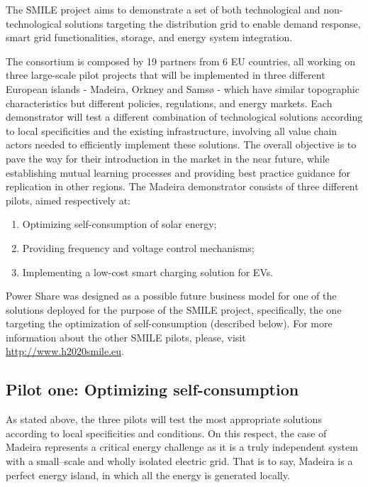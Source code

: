 The SMILE project aims to demonstrate a set of both technological and non-technological solutions targeting the distribution grid to enable demand response, smart grid functionalities, storage, and energy system integration.



The consortium is composed by 19 partners from 6 EU countries, all working on three large-scale pilot projects that will be implemented in three different European islands - Madeira, Orkney and Samsø - which have similar topographic characteristics but different policies, regulations, and energy markets. Each demonstrator will test a different combination of technological solutions according to local specificities and the existing infrastructure, involving all value chain actors needed to efficiently implement these solutions. The overall objective is to pave the way for their introduction in the market in the near future, while establishing mutual learning processes and providing best practice guidance for replication in other regions. The Madeira demonstrator consists of three different pilots, aimed respectively at:

\begin{enumerate}
\item Optimizing self-consumption of solar energy;
\item Providing frequency and voltage control mechanisms;
\item Implementing a low-cost smart charging solution for \acp{EV}.
\end{enumerate}

Power Share was designed as a possible future business model for one of the solutions deployed for the purpose of the SMILE project, specifically, the one targeting the optimization of self-consumption (described below). For more information about the other SMILE pilots, please, visit \url{http://www.h2020smile.eu}.


\subsection{Pilot one: Optimizing self-consumption}

As stated above, the three pilots will test the most appropriate solutions according to local specificities and conditions. On this respect, the case of Madeira represents a critical energy challenge as it is a truly independent system with a small--scale and wholly isolated electric grid. That is to say, Madeira is a perfect energy island, in which all the energy is generated locally.



